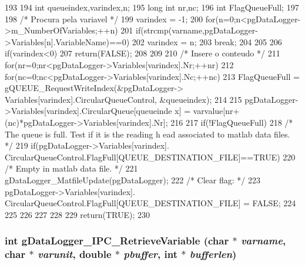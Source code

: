\begin{DoxyCode}
193 {
194         int queueindex,varindex,n;
195         long int nr,nc;
196         int FlagQueueFull;
197         
198         /* Procura pela variavel */
199         varindex = -1;
200         for(n=0;n<pgDataLogger->m_NumberOfVariables;++n){
201                 if(strcmp(varname,pgDataLogger->Variables[n].VariableName)==0){
202                         varindex = n;
203                         break;
204                 }
205         }
206         if(varindex<0){
207                 return(FALSE);
208         }
209 
210         /* Insere o conteudo */
211         for(nr=0;nr<pgDataLogger->Variables[varindex].Nr;++nr){
212                 for(nc=0;nc<pgDataLogger->Variables[varindex].Nc;++nc){
213                         FlagQueueFull = gQUEUE_RequestWriteIndex(&pgDataLogger->
      Variables[varindex].CircularQueueControl, &queueindex);
214 
215                         pgDataLogger->Variables[varindex].CircularQueue[queueinde
      x] = varvalue[nr+(nc)*pgDataLogger->Variables[varindex].Nr];
216 
217                         if(!FlagQueueFull){
218                                 /* The queue is full. Test if it is the reading h
      ead associated to matlab data files. */
219                                 if(pgDataLogger->Variables[varindex].
      CircularQueueControl.FlagFull[QUEUE_DESTINATION_FILE]==TRUE){
220                                         /* Empty in matlab data file. */
221                                         gDataLogger_MatfileUpdate(pgDataLogger);
222                                         /* Clear flag: */
223                                         pgDataLogger->Variables[varindex].
      CircularQueueControl.FlagFull[QUEUE_DESTINATION_FILE] = FALSE;
224                                 }
225                         }
226                 }
227         }
228 
229         return(TRUE);
230 }
\end{DoxyCode}
\subsubsection[{gDataLogger\_\-IPC\_\-RetrieveVariable}]{\setlength{\rightskip}{0pt plus 5cm}int gDataLogger\_\-IPC\_\-RetrieveVariable (char $\ast$ {\em varname}, \/  char $\ast$ {\em varunit}, \/  double $\ast$ {\em pbuffer}, \/  int $\ast$ {\em bufferlen})}\label{gdatalogger_8c_a555a2628f1bfa33692e5f51961d287a5}


